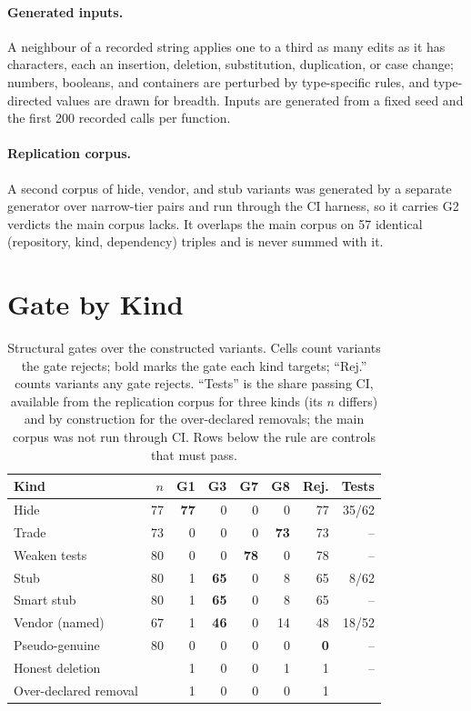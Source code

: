 \documentclass[11pt]{article}
\begin{document}
\paragraph{Generated inputs.}
A neighbour of a recorded string applies one to a third as many edits as it has characters, each an insertion, deletion, substitution, duplication, or case change; numbers, booleans, and containers are perturbed by type-specific rules, and type-directed values are drawn for breadth.
Inputs are generated from a fixed seed and the first 200 recorded calls per function.
\paragraph{Replication corpus.}
A second corpus of hide, vendor, and stub variants was generated by a separate generator over narrow-tier pairs and run through the CI harness, so it carries G2 verdicts the main corpus lacks.
It overlaps the main corpus on 57 identical (repository, kind, dependency) triples and is never summed with it.



\section{Gate by Kind}
\label{app:matrix}
\begin{table}[h]
\centering
\small
\setlength{\tabcolsep}{3.5pt}
\begin{tabular}{lrrrrrrr}
\hline
\textbf{Kind} & $n$ & G1 & G3 & G7 & G8 & \textbf{Rej.} & Tests \\
\hline
Hide & 77 & \textbf{77} & 0 & 0 & 0 & 77 & 35/62 \\
Trade & 73 & 0 & 0 & 0 & \textbf{73} & 73 & -- \\
Weaken tests & 80 & 0 & 0 & \textbf{78} & 0 & 78 & -- \\
Stub & 80 & 1 & \textbf{65} & 0 & 8 & 65 & 8/62 \\
Smart stub & 80 & 1 & \textbf{65} & 0 & 8 & 65 & -- \\
Vendor (named) & 67 & 1 & \textbf{46} & 0 & 14 & 48 & 18/52 \\
Pseudo-genuine & 80 & 0 & 0 & 0 & 0 & \textbf{0} & -- \\
\hline
Honest deletion & \nHonest{} & 1 & 0 & 0 & 1 & 1 & -- \\
Over-declared removal & \nOverDeclGraded{} & 1 & 0 & 0 & 0 & 1 & \nOverDeclGraded{} \\
\hline
\end{tabular}
\caption{Structural gates over the constructed variants. Cells count variants the gate rejects; bold marks the gate each kind targets; ``Rej.'' counts variants any gate rejects. ``Tests'' is the share passing CI, available from the replication corpus for three kinds (its $n$ differs) and by construction for the over-declared removals; the main corpus was not run through CI. Rows below the rule are controls that must pass.}
\label{tab:matrix}
\end{table}
\end{document}
